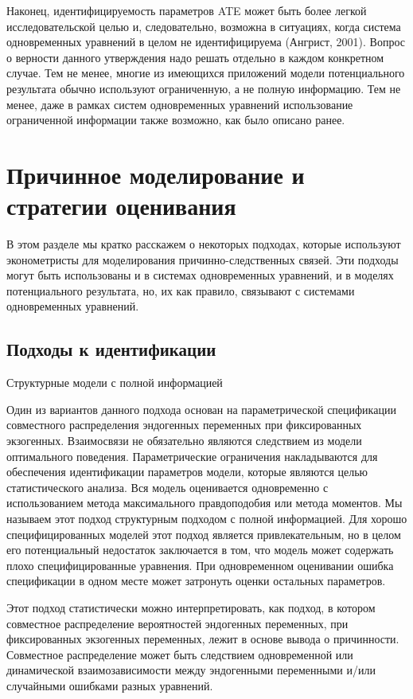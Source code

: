 	
	Наконец, идентифицируемость  параметров ATE может быть более легкой исследовательской целью  и, следовательно, возможна в ситуациях, когда  система одновременных уравнений в целом не идентифицируема (Ангрист, 2001). Вопрос о верности данного утверждения надо решать отдельно в каждом конкретном случае. Тем не менее, многие из имеющихся приложений модели потенциального результата обычно используют ограниченную, а не полную информацию. Тем не менее, даже в рамках систем одновременных уравнений использование ограниченной информации также возможно, как было описано ранее.



\section{Причинное моделирование и стратегии оценивания}


В этом разделе мы кратко расскажем о некоторых подходах, которые используют эконометристы для моделирования причинно-следственных связей. Эти подходы могут быть использованы и в системах одновременных уравнений, и в моделях потенциального результата, но, их как правило, связывают с системами одновременных уравнений.

\subsection{Подходы к идентификации}
\begin{center}
Структурные модели с полной информацией
\end{center}


Один из вариантов данного подхода основан на параметрической спецификации совместного распределения эндогенных переменных при фиксированных экзогенных. Взаимосвязи не обязательно являются следствием из  модели оптимального поведения. Параметрические ограничения накладываются для обеспечения идентификации параметров модели, которые являются целью статистического анализа. Вся модель оценивается одновременно с использованием метода максимального правдоподобия или метода моментов. Мы называем этот подход структурным подходом с полной информацией. Для хорошо специфицированных моделей этот подход является привлекательным, но в целом его потенциальный недостаток заключается в том, что модель может содержать плохо специфицированные  уравнения. При одновременном оценивании ошибка спецификации в одном месте может затронуть оценки остальных параметров. 


Этот подход статистически можно интерпретировать, как подход, в котором совместное распределение вероятностей эндогенных переменных, при фиксированных экзогенных переменных, лежит в основе вывода о причинности. Совместное распределение может быть следствием одновременной или динамической взаимозависимости между эндогенными переменными и/или случайными ошибками разных уравнений.
	

